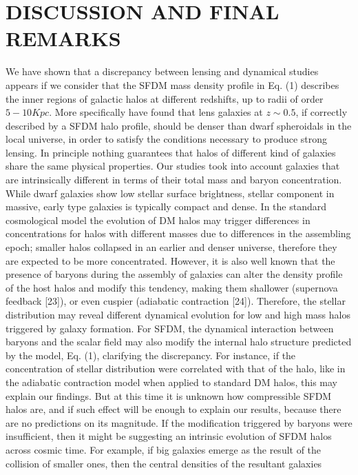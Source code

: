 \documentclass[9.5pt, twocolumn]{article}
\begin{document}
\section[IV]{\centering \little DISCUSSION AND FINAL REMARKS}
We have shown that a discrepancy between lensing and
dynamical studies appears if we consider that the SFDM
mass density profile in Eq. (1) describes the inner regions
of galactic halos at different redshifts, up to radii of order
$5 - 10 Kpc.$ More  specifically have found that lens
galaxies at $z \sim 0.5$, if correctly described by a SFDM halo
profile, should be denser than dwarf spheroidals in the
local universe, in order to satisfy the conditions necessary
to produce strong lensing.
In principle nothing guarantees that halos of different
kind of galaxies share the same physical properties.
Our studies took into account galaxies that are intrinsically
different in terms of their total mass and baryon
concentration. While dwarf galaxies show low stellar surface
brightness, stellar component in massive, early type
galaxies is typically compact and dense.
In the standard cosmological model the evolution of
DM halos may trigger differences in concentrations for
halos with different masses due to differences in the assembling
epoch; smaller halos collapsed in an earlier and
denser universe, therefore they are expected to be more
concentrated. However, it is also well known that the
presence of baryons during the assembly of galaxies can
alter the density profile of the host halos and modify
this tendency, making them shallower (supernova feedback
[23]), or even cuspier (adiabatic contraction [24]).
Therefore, the stellar distribution may reveal different
dynamical evolution for low and high mass halos triggered
by galaxy formation.
For SFDM, the dynamical interaction between baryons
and the scalar field may also modify the internal halo
structure predicted by the model, Eq. (1), clarifying the
discrepancy. For instance, if the concentration of stellar
distribution were correlated with that of the halo,
like in the adiabatic contraction model when applied to
standard DM halos, this may explain our findings. But
at this time it is unknown how compressible SFDM halos
are, and if such effect will be enough to explain our
results, because there are no predictions on its magnitude.
If the modification triggered by baryons were insufficient, then it might be suggesting an intrinsic evolution
of SFDM halos across cosmic time. For example, if big
galaxies emerge as the result of the collision of smaller
ones, then the central densities of the resultant galaxies
\end{document}

